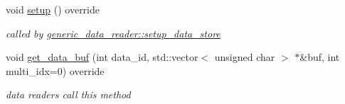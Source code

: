 \begin{DoxyCompactItemize}
void \hyperlink{classlbann_1_1data__store__image_a79280b3aa9a207dfacad2bcc9824ec73}{setup} () override
\begin{DoxyCompactList}\small\item\em called by \hyperlink{classlbann_1_1generic__data__reader_a8b2a09d38512fc11f1b9d572c89100a7}{generic\+\_\+data\+\_\+reader\+::setup\+\_\+data\+\_\+store} \end{DoxyCompactList}\item 
void \hyperlink{classlbann_1_1data__store__image_aa9e47fb3cad58dda4eaddcccc9bfa523}{get\+\_\+data\+\_\+buf} (int data\+\_\+id, std\+::vector$<$ unsigned char $>$ $\ast$\&buf, int multi\+\_\+idx=0) override
\begin{DoxyCompactList}\small\item\em data readers call this method \end{DoxyCompactList}\end{DoxyCompactItemize}
